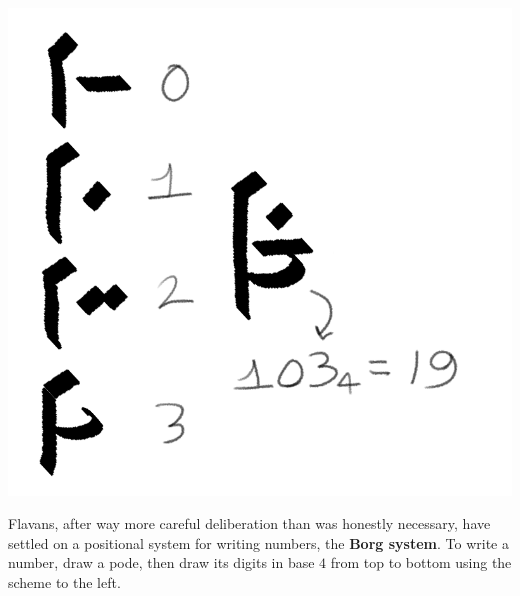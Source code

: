 \documentclass[10pt,oneside]{memoir}
\begin{document}
\vfill


\vspace{-50pt}

\begin{minipage}[]{0.45\textwidth}
    \centering
    \includegraphics{digits}
\end{minipage}
\hfill
\begin{minipage}[]{0.5\textwidth}
    Flavans, after way more careful deliberation than was honestly necessary, have settled on a positional system for writing numbers, the \textbf{Borg system}. To write a number, draw a pode, then draw its digits in base $4$ from top to bottom using the scheme to the left.
\end{minipage}



\vfill
\end{document}
